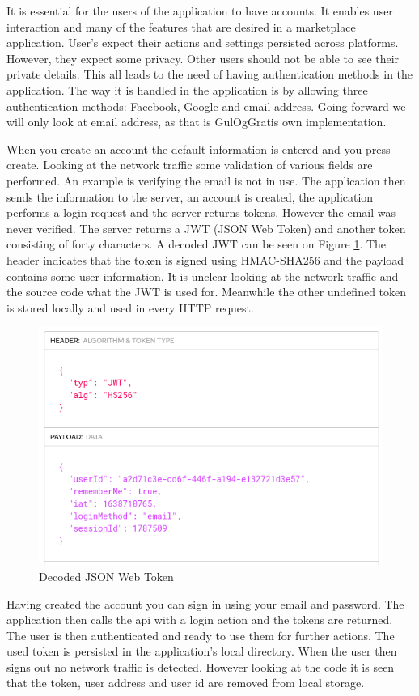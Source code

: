 It is essential for the users of the application to have accounts. It enables user interaction and many of the features that are desired in a marketplace application. User's expect their actions and settings persisted across platforms. However, they expect some privacy. Other users should not be able to see their private details. This all leads to the need of having authentication methods in the application. The way it is handled in the application is by allowing three authentication methods: Facebook, Google and email address. Going forward we will only look at email address, as that is GulOgGratis own implementation. 

When you create an account the default information is entered and you press create. Looking at the network traffic some validation of various fields are performed. An example is verifying the email is not in use. The application then sends the information to the server, an account is created, the application performs a login request and the server returns tokens. However the email was never verified. The server returns a JWT (JSON Web Token) and another token consisting of forty characters. A decoded JWT can be seen on Figure \ref{fig:jwt_decoded}. The header indicates that the token is signed using HMAC-SHA256 and the payload contains some user information. It is unclear looking at the network traffic and the source code what the JWT is used for. Meanwhile the other undefined token is stored locally and used in every HTTP request.  

\begin{figure}[htbp]
    \centering
    \includegraphics[width=0.7\columnwidth]{../dynamic-analysis/pictures/jwt_decoded.png}
    \caption{Decoded JSON Web Token}
    \label{fig:jwt_decoded}
\end{figure}

Having created the account you can sign in using your email and password. The application then calls the api with a login action and the tokens are returned. The user is then authenticated and ready to use them for further actions. The used token is persisted in the application's local directory. When the user then signs out no network traffic is detected. However looking at the code it is seen that the token, user address and user id are removed from local storage.      

